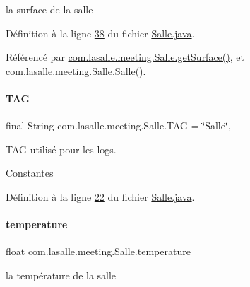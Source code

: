la surface de la salle 



Définition à la ligne \hyperlink{_salle_8java_source_l00038}{38} du fichier \hyperlink{_salle_8java_source}{Salle.\+java}.



Référencé par \hyperlink{_salle_8java_source_l00215}{com.\+lasalle.\+meeting.\+Salle.\+get\+Surface()}, et \hyperlink{_salle_8java_source_l00054}{com.\+lasalle.\+meeting.\+Salle.\+Salle()}.

\mbox{\label{classcom_1_1lasalle_1_1meeting_1_1_salle_aecf7e402dafb939f8ac2f2873f66af25}} 
\paragraph{\texorpdfstring{T\+AG}{TAG}}
{\footnotesize\ttfamily final String com.\+lasalle.\+meeting.\+Salle.\+T\+AG = \char`\"{}Salle\char`\"{}\hspace{0.3cm}{\ttfamily [static]}, {\ttfamily [private]}}



T\+AG utilisé pour les logs. 

Constantes 

Définition à la ligne \hyperlink{_salle_8java_source_l00022}{22} du fichier \hyperlink{_salle_8java_source}{Salle.\+java}.

\mbox{\label{classcom_1_1lasalle_1_1meeting_1_1_salle_a31600559f77e2eeb1f6aa150b203213e}} 
\paragraph{\texorpdfstring{temperature}{temperature}}
{\footnotesize\ttfamily float com.\+lasalle.\+meeting.\+Salle.\+temperature\hspace{0.3cm}{\ttfamily [private]}}



la température de la salle 



